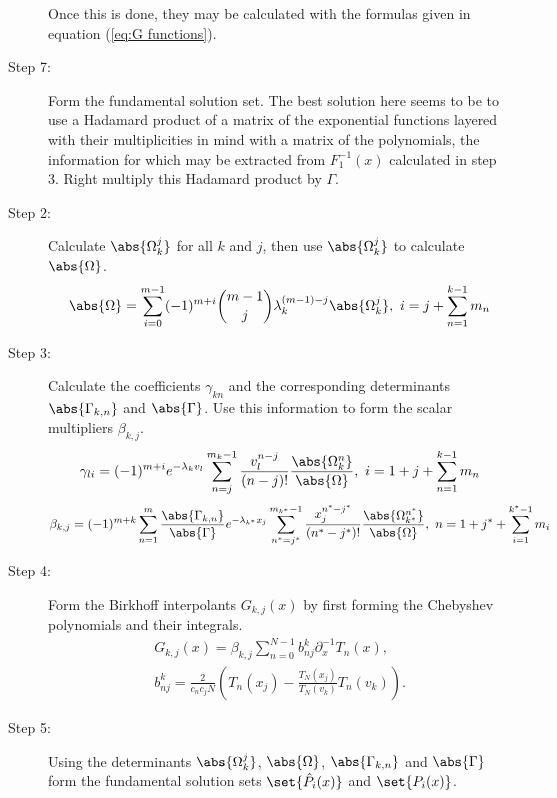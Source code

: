\documentclass{article}
\begin{document}
\begin{description}
Once this is done, they may be calculated with the formulas given in equation (\ref{eq:G functions}).
\item[Step 7:] Form the fundamental solution set.
The best solution here seems to be to use a Hadamard product of a matrix of the exponential functions layered with their multiplicities in mind with a matrix of the polynomials, the information for which may be extracted from $F_1^{-1}(x)$ calculated in step 3.
Right multiply this Hadamard product by $\Gamma$.
\item[Step 2:] Calculate $\abs{\Omega_k^j}$ for all $k$ and $j$, then use $\abs{\Omega_k^j}$ to calculate $\abs{\Omega}$.
\begin{equation*}
\abs{\Omega} = \sum_{i=0}^{m-1} (-1)^{m+i} \binom{m-1}{j} \lambda_k^{(m-1)-j} \abs{\Omega_k^j}, \ i = j + \sum_{n=1}^{k-1} m_n
\end{equation*}
\item[Step 3:] Calculate the coefficients $\gamma_{kn}$ and the corresponding determinants $\abs{\Gamma_{k,n}}$ and $\abs{\Gamma}$. Use this information to form the scalar multipliers $\beta_{k,j}$.
\begin{equation*}
\gamma_{li} = (-1)^{m+i} e^{-\lambda_k v_l} \sum_{n=j}^{m_k-1} \frac{v_l^{n-j}}{(n-j)!} \frac{\abs{\Omega_k^n}}{\abs{\Omega}}, \ i = 1 + j + \sum_{n=1}^{k-1} m_n
\end{equation*}
\begin{equation*}
\beta_{k,j} = (-1)^{m+k} \sum_{n=1}^m \frac{\abs{\Gamma_{k,n}}}{\abs{\Gamma}} e^{-\lambda_{k^*} x_j} \sum_{n^*=j^*}^{m_{k^*}-1} \frac{x_j^{n^*-j^*}}{(n^*-j^*)!} \frac{\abs{\Omega_{k^*}^{n^*}}}{\abs{\Omega}}, \ n = 1 + j^* + \sum_{i=1}^{k^*-1} m_i
\end{equation*}
\item[Step 4:] Form the Birkhoff interpolants $G_{k,j}(x)$ by first forming the Chebyshev polynomials and their integrals.
\begin{equation*}
\begin{gathered}
G_{k,j} (x) = \beta_{k,j} \sum_{n=0}^{N-1} b^k_{nj} \partial_x^{-1} T_n(x), \\
 b^k_{nj} = \frac{2}{c_n c_j N} \left ( T_n(x_j) - \frac{T_N(x_j)}{T_N(v_k)} T_n(v_k) \right ).
\end{gathered}
\end{equation*}
\item[Step 5:] Using the determinants $\abs{\Omega_k^j}$, $\abs{\Omega}$, $\abs{\Gamma_{k,n}}$ and $\abs{\Gamma}$ form the fundamental solution sets $\set{\hat{P}_i(x)}$ and $\set{P_i(x)}$.

\end{description}
\end{document}
